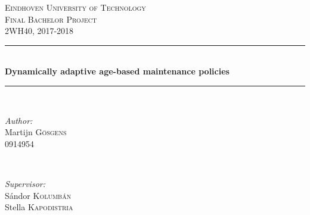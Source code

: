 \begin{titlepage}

\newcommand{\HRule}{\rule{\linewidth}{0.5mm}} %

\center %
 

\textsc{\LARGE Eindhoven University of Technology}\\[1.5cm] %

\textsc{\Large Final Bachelor Project}\\[0.5cm] %
\textsc{\large 2WH40, 2017-2018}\\[0.5cm] %

\HRule \\[0.4cm]
{ \huge \bfseries Dynamically adaptive age-based maintenance policies}\\[0.4cm] %
\HRule \\[1.5cm]
 

\begin{minipage}{0.4\textwidth}
\begin{flushleft} \large
\emph{Author:}\\
Martijn \textsc{G\"{o}sgens}\\
0914954 %
\end{flushleft}
\end{minipage}
~
\begin{minipage}{0.4\textwidth}
\begin{flushright} \large
\emph{Supervisor:} \\
S\'{a}ndor \textsc{Kolumb\'{a}n}\\ %
Stella \textsc{Kapodistria}
\end{flushright}
\end{minipage}\\[2cm]


\end{titlepage}
